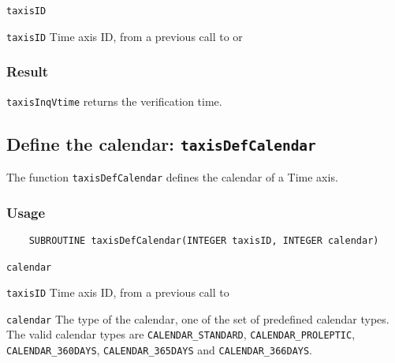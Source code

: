 \hspace*{4mm}\begin{minipage}[]{15cm}
\begin{deflist}{\texttt{taxisID}\ }
\item[\texttt{taxisID}]
Time axis ID, from a previous call to {} or {}

\end{deflist}
\end{minipage}

\subsubsection*{Result}

{\texttt{taxisInqVtime}} returns the verification time.



\subsection{Define the calendar: \texttt{taxisDefCalendar}}
\label{taxisDefCalendar}

The function {\texttt{taxisDefCalendar}} defines the calendar of a Time axis.

\subsubsection*{Usage}

\begin{verbatim}
    SUBROUTINE taxisDefCalendar(INTEGER taxisID, INTEGER calendar)
\end{verbatim}

\hspace*{4mm}\begin{minipage}[]{15cm}
\begin{deflist}{\texttt{calendar}\ }
\item[\texttt{taxisID}]
Time axis ID, from a previous call to {}
\item[\texttt{calendar}]
The type of the calendar, one of the set of predefined {\CDI} calendar types.
                    The valid {\CDI} calendar types are {\texttt{CALENDAR\_STANDARD}}, {\texttt{CALENDAR\_PROLEPTIC}},
                    {\texttt{CALENDAR\_360DAYS}}, {\texttt{CALENDAR\_365DAYS}} and {\texttt{CALENDAR\_366DAYS}}.

\end{deflist}
\end{minipage}


